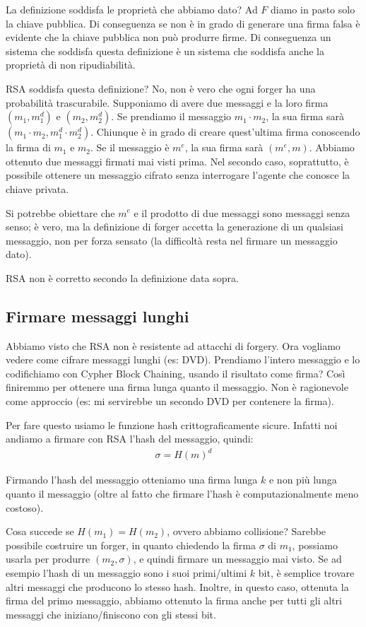 \noindent La definizione soddisfa le proprietà che abbiamo dato? Ad $F$ diamo in pasto solo la chiave pubblica. Di conseguenza se non è in grado di generare una firma falsa è evidente che la chiave pubblica non può produrre firme. Di conseguenza un sistema che soddisfa questa definizione è un sistema che soddisfa anche la proprietà di non ripudiabilità.

RSA soddisfa questa definizione? No, non è vero che ogni forger ha una probabilità trascurabile. Supponiamo di avere due messaggi e la loro firma $(m_1, m_1^d)$ e $(m_2, m_2^d)$. Se prendiamo il messaggio $m_1 \cdot m_2$, la sua firma sarà $(m_1 \cdot m_2, m_1^d \cdot m_2^d)$. Chiunque è in grado di creare quest'ultima firma conoscendo la firma di $m_1$ e $m_2$. Se il messaggio è $m^e$, la sua firma sarà $(m^e, m)$. Abbiamo ottenuto due messaggi firmati mai visti prima. Nel secondo caso, soprattutto, è possibile ottenere un messaggio cifrato senza interrogare l'agente che conosce la chiave privata.

Si potrebbe obiettare che $m^e$ e il prodotto di due messaggi sono messaggi senza senso; è vero, ma la definizione di forger accetta la generazione di un qualsiasi messaggio, non per forza sensato (la difficoltà resta nel firmare un messaggio dato).

RSA non è corretto secondo la definizione data sopra.

\subsection{Firmare messaggi lunghi}
Abbiamo visto che RSA non è resistente ad attacchi di forgery. Ora vogliamo vedere come cifrare messaggi lunghi (es: DVD). Prendiamo l'intero messaggio e lo codifichiamo con Cypher Block Chaining, usando il risultato come firma? Così finiremmo per ottenere una firma lunga quanto il messaggio. Non è ragionevole come approccio (es: mi servirebbe un secondo DVD per contenere la firma). 

Per fare questo usiamo le funzione hash crittograficamente sicure. Infatti noi andiamo a firmare con RSA l'hash del messaggio, quindi:
\begin{align*}
    \sigma = H(m)^d
\end{align*}

\noindent Firmando l'hash del messaggio otteniamo una firma lunga $k$ e non più lunga quanto il messaggio (oltre al fatto che firmare l'hash è computazionalmente meno costoso). 

Cosa succede se $H(m_1) = H(m_2)$, ovvero abbiamo collisione? Sarebbe possibile costruire un forger, in quanto chiedendo la firma $\sigma$ di $m_1$, possiamo usarla per produrre $(m_2, \sigma)$, e quindi firmare un messaggio mai visto. Se ad esempio l'hash di un messaggio sono i suoi primi/ultimi $k$ bit, è semplice trovare altri messaggi che producono lo stesso hash. Inoltre, in questo caso, ottenuta la firma del primo messaggio, abbiamo ottenuto la firma anche per tutti gli altri messaggi che iniziano/finiscono con gli stessi bit. 

